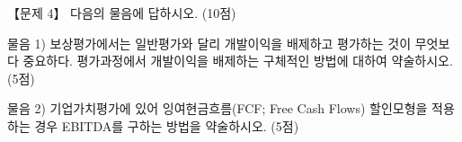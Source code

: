 \begin{longquestion}{【문제 4】}
다음의 물음에 답하시오. (10점) \par
\medskip\noindent 물음 1) 보상평가에서는 일반평가와 달리 개발이익을 배제하고 평가하는 것이 무엇보다 중요하다. 평가과정에서 개발이익을 배제하는 구체적인 방법에 대하여 약술하시오. (5점) \par
\medskip\noindent 물음 2) 기업가치평가에 있어 잉여현금흐름(FCF; Free Cash Flows) 할인모형을 적용하는 경우 EBITDA를 구하는 방법을 약술하시오. (5점) \par
\end{longquestion}
